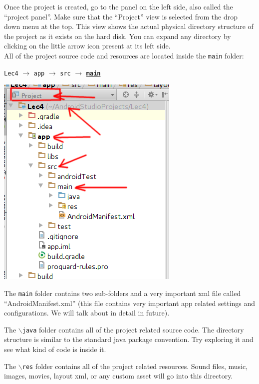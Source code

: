 Once the project is created, go to the panel on the left side, also called the ``project panel''. Make sure that the ``Project'' view is selected from the drop down menu at the top. This view shows the actual physical directory structure of the project as it exists on the hard disk. You can expand any directory by clicking on the little arrow icon present at its left side. \\

All of the project source code and resources are located inside the \texttt{main} folder:

\texttt{Lec4} $\rightarrow$ \texttt{app} $\rightarrow$ \texttt{src} $\rightarrow$ \underline{\textbf{\texttt{main}}}

\begin{center}
	\includegraphics[scale=0.4]{chapters/ch04/images/1_project_panel}
\end{center}

The \texttt{main} folder contains two sub-folders and a very important xml file called ``AndroidManifest.xml'' (this file contains very important app related settings and configurations. We will talk about in detail in future). 

The \texttt{$\backslash$java} folder contains all of the project related source code. The directory structure is similar to the standard java package convention. Try exploring it and see what kind of code is inside it.

The \texttt{$\backslash$res} folder contains all of the project related resources. Sound files, music, images, movies, layout xml, or any custom asset will go into this directory. \\

